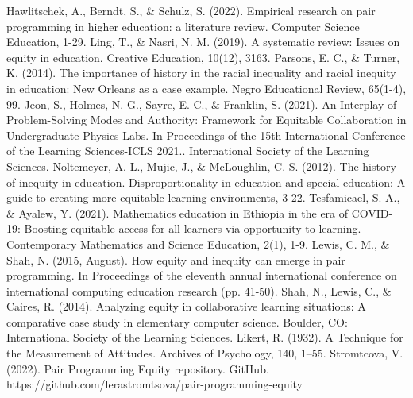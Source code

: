 \documentclass[conference]{IEEEtran}
\begin{document}
\begin{thebibliography}{00}
 Hawlitschek, A., Berndt, S., \& Schulz, S. (2022). Empirical research on pair programming in higher education: a literature review. Computer Science Education, 1-29.
 Ling, T., \& Nasri, N. M. (2019). A systematic review: Issues on equity in education. Creative Education, 10(12), 3163.
 Parsons, E. C., \& Turner, K. (2014). The importance of history in the racial inequality and racial inequity in education: New Orleans as a case example. Negro Educational Review, 65(1-4), 99.
 Jeon, S., Holmes, N. G., Sayre, E. C., \& Franklin, S. (2021). An Interplay of Problem-Solving Modes and Authority: Framework for Equitable Collaboration in Undergraduate Physics Labs. In Proceedings of the 15th International Conference of the Learning Sciences-ICLS 2021.. International Society of the Learning Sciences.
 Noltemeyer, A. L., Mujic, J., \& McLoughlin, C. S. (2012). The history of inequity in education. Disproportionality in education and special education: A guide to creating more equitable learning environments, 3-22.
 Tesfamicael, S. A., \& Ayalew, Y. (2021). Mathematics education in Ethiopia in the era of COVID-19: Boosting equitable access for all learners via opportunity to learning. Contemporary Mathematics and Science Education, 2(1), 1-9.
 Lewis, C. M., \& Shah, N. (2015, August). How equity and inequity can emerge in pair programming. In Proceedings of the eleventh annual international conference on international computing education research (pp. 41-50).
 Shah, N., Lewis, C., \& Caires, R. (2014). Analyzing equity in collaborative learning situations: A comparative case study in elementary computer science. Boulder, CO: International Society of the Learning Sciences.
 Likert, R. (1932). A Technique for the Measurement of Attitudes. Archives of Psychology, 140, 1–55.
 Stromtcova, V. (2022). Pair Programming Equity repository. GitHub. https://github.com/lerastromtsova/pair-programming-equity

\end{thebibliography}
\vspace{12pt}
\end{document}
